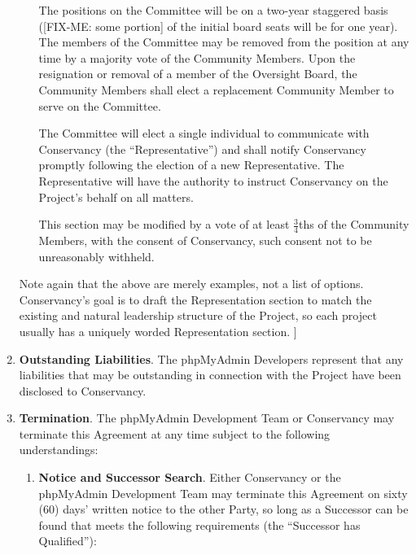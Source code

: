\documentclass[letterpaper,12pt]{article}
\newcommand{\signatories}{phpMyAdmin Developers\xspace}
\newcommand{\leadershipbody}{phpMyAdmin Development Team\xspace}
\begin{document}
\begin{enumerate}[label=\arabic*.,ref=\S~\arabic*]
\begin{itemize}
The positions on the Committee will be on a two-year staggered basis 
([FIX-ME: some portion] of the initial board seats will be for one year).  
The members of the Committee may be removed from the position at any time 
by a majority vote of the Community Members.  Upon the resignation or 
removal of a member of the Oversight Board, the Community Members shall 
elect a replacement Community Member to serve on the Committee. 

The Committee will elect a single individual to communicate with 
Conservancy (the ``Representative'') and shall notify Conservancy promptly 
following the election of a new Representative.  The Representative will 
have the authority to instruct Conservancy on the Project's behalf on all
matters.  

This section may be modified by a vote of at least $\frac{3}{4}$ths of the 
Community Members, with the consent of Conservancy, such consent not to be 
unreasonably withheld.


\end{itemize}

Note again that the above are merely examples, not a list of options.
Conservancy's goal is to draft the Representation section to match
the existing and natural leadership structure of the Project, so each
project usually has a uniquely worded Representation section. ]

\item \textbf{Outstanding Liabilities}. The \signatories represent
that any liabilities that may be outstanding in connection with the
Project have been disclosed to Conservancy. 
\item \textbf{Termination}. \label{Termination} The \leadershipbody or Conservancy
may terminate this Agreement at any time subject to the following
understandings:


\begin{enumerate}[label=\alph*.,ref=\theenumi(\arabic*)]

\item \textbf{Notice and Successor Search}. Either Conservancy or the \leadershipbody
may terminate this Agreement on sixty (60) days' written notice to
the other Party, so long as a Successor can be found that meets the
following requirements (the ``Successor has Qualified''):



\end{enumerate}
\end{enumerate}
\end{document}

